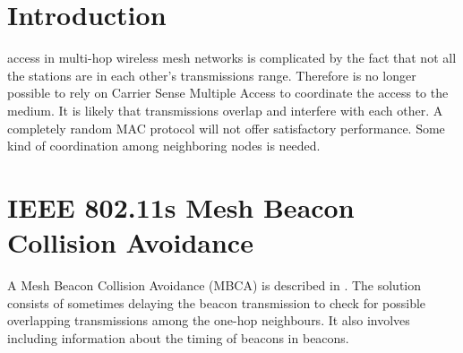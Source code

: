 \documentclass[journal]{IEEEtran}
\begin{document}
%
\IEEEpeerreviewmaketitle



\section{Introduction}
%
%
%
%



 access in multi-hop wireless mesh networks is complicated by the fact that not all the stations are in each other's transmissions range.
Therefore is no longer possible to rely on Carrier Sense Multiple Access to coordinate the access to the medium.
It is likely that transmissions overlap and interfere with each other.
A completely random MAC protocol will not offer satisfactory performance.
Some kind of coordination among neighboring nodes is needed.

\section{IEEE 802.11s Mesh Beacon Collision Avoidance}
A Mesh Beacon Collision Avoidance (MBCA) is described in \cite{hiertz2007pis}.
The solution consists of sometimes delaying the beacon transmission to check for possible overlapping transmissions among the one-hop neighbours.
It also involves including information about the timing of beacons in beacons.
\end{document}
